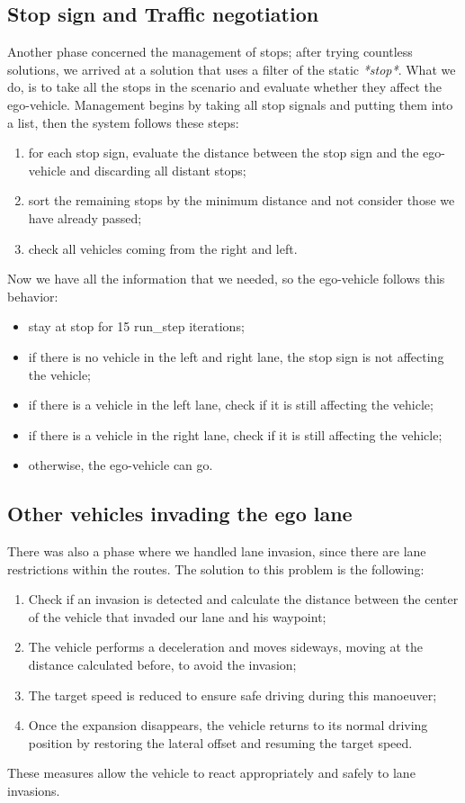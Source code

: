 \documentclass{article}
\begin{document}
\subsection{Stop sign and Traffic negotiation}
Another phase concerned the management of stops; after trying countless solutions, we arrived at a solution that
uses a filter of the static \textit{*stop*}. What we do, is to take all the stops in the scenario and evaluate whether they
affect the ego-vehicle.
Management begins by taking all stop signals and putting them into a list, then the system follows these steps:
\begin{enumerate}
    \item for each stop sign, evaluate the distance between the stop sign and the ego-vehicle and discarding all distant stops;
    \item sort the remaining stops by the minimum distance and not consider those we have already passed;
    \item check all vehicles coming from the right and left.
\end{enumerate}
Now we have all the information that we needed, so the ego-vehicle follows this behavior:
\begin{itemize}
    \item stay at stop for 15 run\_step iterations;
    \item if there is no vehicle in the left and right lane, the stop sign is not affecting the vehicle;
    \item if there is a vehicle in the left lane, check if it is still affecting the vehicle;
    \item if there is a vehicle in the right lane, check if it is still affecting the vehicle;
    \item otherwise, the ego-vehicle can go.
\end{itemize}

\subsection{Other vehicles invading the ego lane}
There was also a phase where we handled lane invasion, since there are lane restrictions within the routes.
The solution to this problem is the following:
\begin{enumerate}
    \item Check if an invasion is detected and calculate the distance between the center of the vehicle that invaded our lane and his waypoint;
    \item The vehicle performs a deceleration and moves sideways, moving at the distance calculated before, to avoid the invasion;
    \item The target speed is reduced to ensure safe driving during this manoeuver;
    \item Once the expansion disappears, the vehicle returns to its normal driving position by restoring the lateral offset and resuming the target speed.
\end{enumerate}
These measures allow the vehicle to react appropriately and safely to lane invasions.
\end{document}
